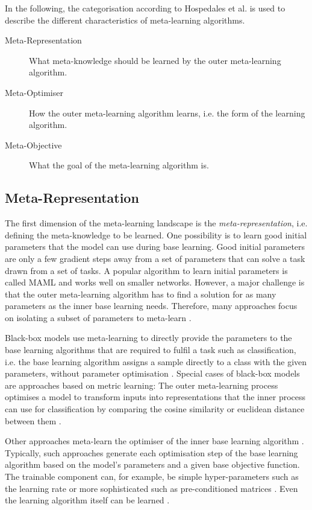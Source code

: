 In the following, the categorisation according to Hospedales et al. \cite{Hospedales_Antoniou_Micaelli_Storkey_2021} is used to describe the different characteristics of meta-learning algorithms.
\begin{description}
   \item[Meta-Representation] What meta-knowledge should be learned by the outer meta-learning algorithm.
   \item[Meta-Optimiser] How the outer meta-learning algorithm learns, i.e. the form of the learning algorithm.
   \item[Meta-Objective] What the goal of the meta-learning algorithm is.
\end{description}


\subsection{Meta-Representation}
The first dimension of the meta-learning landscape is the \emph{meta-representation}, i.e. defining the meta-knowledge to be learned.
One possibility is to learn good initial parameters that the model can use during base learning.
Good initial parameters are only a few gradient steps away from a set of parameters that can solve a task drawn from a set of tasks.
A popular algorithm to learn initial parameters is called MAML  and works well on smaller networks.
However, a major challenge is that the outer meta-learning algorithm has to find a solution for as many parameters as the inner base learning needs.
Therefore, many approaches focus on isolating a subset of parameters to meta-learn \cite{lee2018gradient, qiao2018few, rusu2018meta}.

Black-box models use meta-learning to directly provide the parameters to the base learning algorithms that are required to fulfil a task such as classification, i.e. the base learning algorithm assigns a sample directly to a class with the given parameters, without parameter optimisation \cite{heskes2000empirical, 10-5555-3454287-3455002, Ha_Dai_Le_2016}.
Special cases of black-box models are approaches based on metric learning:
The outer meta-learning process optimises a model to transform inputs into representations that the inner process can use for classification by comparing the cosine similarity or euclidean distance between them \cite{10-5555-3294996-3295163, qiao2018few, Chen_Liu_Kira_Wang_Huang_2020}.

Other approaches meta-learn the optimiser of the inner base learning algorithm \cite{ravi2017optimization, Li_Malik_2016, Li_Zhou_Chen_Li_2017}.
Typically, such approaches generate each optimisation step of the base learning algorithm based on the model's parameters and a given base objective function.
The trainable component can, for example, be simple hyper-parameters such as the learning rate  or more sophisticated such as pre-conditioned matrices .
Even the learning algorithm itself can be learned .

